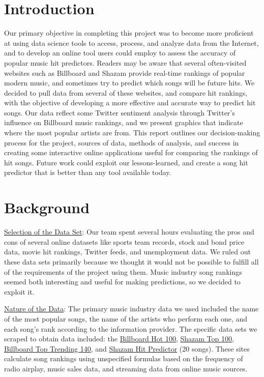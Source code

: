 \documentclass{article}
\begin{document}
\pagebreak

%
%
\section{Introduction}
\label{introduction}

Our primary objective in completing this project was to become more proficient at using data science tools to access, process, and analyze data from the Internet, and to develop an online tool users could employ to assess the accuracy of popular music hit predictors.  Readers may be aware that several often-visited websites such as Billboard and Shazam provide real-time rankings of popular modern music, and sometimes try to predict which songs will be future hits.  We decided to pull data from several of these websites, and compare hit rankings, with the objective of developing a more effective and accurate way to predict hit songs.  Our data reflect some Twitter sentiment analysis through Twitter's influence on Billboard music rankings, and we present graphics that indicate where the most popular artists are from. This report outlines our decision-making process for the project, sources of data, methods of analysis, and success in creating some interactive online applications useful for comparing the rankings of hit songs.  Future work could exploit our lessons-learned, and create a song hit predictor that is better than any tool available today.

\section{Background}

\underline{Selection of the Data Set}:	Our team spent several hours evaluating the pros and cons of several online datasets like sports team records, stock and bond price data, movie hit rankings, Twitter feeds, and unemployment data.  We ruled out these data sets primarily because we thought it would not be possible to fulfill all of the requirements of the project using them. Music industry song rankings seemed both interesting and useful for making predictions, so we decided to exploit it.\vspace{2mm}

\noindent
\underline{Nature of the Data}:  The primary music industry data we used included the name of the most popular songs, the name of the artists who perform each one, and each song's rank according to the information provider.  The specific data sets we scraped to obtain data included:  the \href{http://www.billboard.com/charts/hot-100}{Billboard Hot 100}, \href{http://www.shazam.com/charts/top-100/united-statess}{Shazam Top 100}, \href{http://realtime.billboard.com/?chart=trending140}{Billboard Top Trending 140}, and \href{http://www.shazam.com/charts/future-hits/united-states}{Shazam Hit Predictor} (20 songs).  These sites calculate song rankings using unspecified formulas based on the frequency of radio airplay, music sales data, and streaming data from online music sources. \vspace{2mm}
\end{document}

